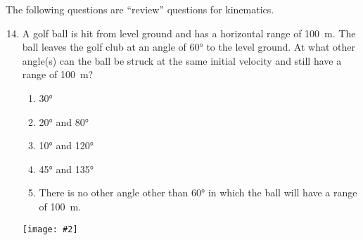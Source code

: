 \documentclass[12pt]{article}
\newcommand{\pic}[2]{\texttt{[image: \#2]}}
\begin{document}
\noindent The following questions are ``review'' questions for kinematics.

\begin{enumerate}[leftmargin=50pt,label=\underline{\hspace{0.4in}} \arabic*.]
  \setcounter{enumi}{13}

\item  A golf ball is hit from level ground and has a horizontal range of
  \SI{100}{m}. The ball leaves the golf club at an angle of \ang{60} to the
  level ground. At what other angle(s) can the ball be struck at the same
  initial velocity and still have a range of \SI{100}{m}?
  \begin{enumerate}[noitemsep,topsep=0pt]
  \item\ang{30}
  \item\ang{20} and \ang{80}
  \item\ang{10} and \ang{120}
  \item\ang{45} and \ang{135}
  \item There is no other angle other than \ang{60} in which the ball will have
    a range of \SI{100}{m}.
  \end{enumerate}
  \begin{center}
    \pic{0.3}{golf.png}
  \end{center}



\end{enumerate}
\end{document}
